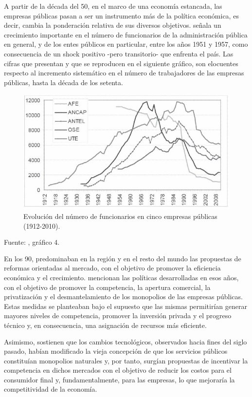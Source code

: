 \documentclass[
  12pt,
  spanish,
]{book}
\begin{document}
A partir de la década del 50, en el marco de una economía estancada, las empresas públicas pasan a ser un instrumento más de la política económica, es decir, cambia la ponderación relativa de sus diversos objetivos. \citet{Rama1990} señala un crecimiento importante en el número de funcionarios de la administración pública en general, y de los entes públicos en particular, entre los años 1951 y 1957, como consecuencia de un shock positivo -pero transitorio- que enfrenta el país. Las cifras que presentan \citet{Bertino2012} y que se reproducen en el siguiente gráfico, son elocuentes respecto al incremento sistemático en el número de trabajadores de las empresas públicas, hasta la década de los setenta.

\begin{figure}
\centering
\includegraphics{imagenes/fig5.jpg}
\caption{Evolución del número de funcionarios en cinco empresas públicas (1912-2010).}
\end{figure}

Fuente: \citet{Bertino2012}, gráfico 4.

En los 90, predominaban en la región y en el resto del mundo las propuestas de reformas orientadas al mercado, con el objetivo de promover la eficiencia económica y el crecimiento. \citet{Forteza2003} mencionan las políticas desarrolladas en esos años, con el objetivo de promover la competencia, la apertura comercial, la privatización y el desmantelamiento de los monopolios de las empresas públicas. Estas medidas se planteaban bajo el supuesto que las mismas permitirían generar mayores niveles de competencia, promover la inversión privada y el progreso técnico y, en consecuencia, una asignación de recursos más eficiente.

Asimismo, sostienen que los cambios tecnológicos, observados hacia fines del siglo pasado, habían modificado la vieja concepción de que los servicios públicos constituían monopolios naturales y, por tanto, surgían propuestas de incentivar la competencia en dichos mercados con el objetivo de reducir los costos para el consumidor final y, fundamentalmente, para las empresas, lo que mejoraría la competitividad de la economía.
\end{document}
